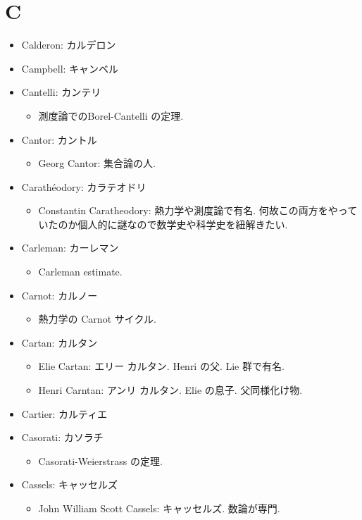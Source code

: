 \documentclass[openany, a4paper, oneside]{jsbook}
\begin{document}
\section{C}

\begin{itemize}
\item Calderon: カルデロン
\item Campbell: キャンベル
\item Cantelli: カンテリ
\begin{itemize}
\item 測度論でのBorel-Cantelli の定理.
\end{itemize}
\item Cantor: カントル
\begin{itemize}
\item Georg Cantor: 集合論の人.
\end{itemize}
\item Carath\'eodory: カラテオドリ
\begin{itemize}
\item Constantin Caratheodory: 熱力学や測度論で有名. 何故この両方をやっていたのか個人的に謎なので数学史や科学史を紐解きたい.
\end{itemize}
\item Carleman: カーレマン
\begin{itemize}
\item Carleman estimate.
\end{itemize}
\item Carnot: カルノー
\begin{itemize}
\item 熱力学の Carnot サイクル.
\end{itemize}
\item Cartan: カルタン
\begin{itemize}
\item Elie Cartan: エリー カルタン. Henri の父. Lie 群で有名.
\item Henri Carntan: アンリ カルタン. Elie の息子. 父同様化け物.
\end{itemize}
\item Cartier: カルティエ
\item Casorati: カソラチ
\begin{itemize}
\item Casorati-Weierstrass の定理.
\end{itemize}
\item Cassels: キャッセルズ
\begin{itemize}
\item John William Scott Cassels: キャッセルズ. 数論が専門.

\end{itemize}
\end{itemize}
\end{document}
